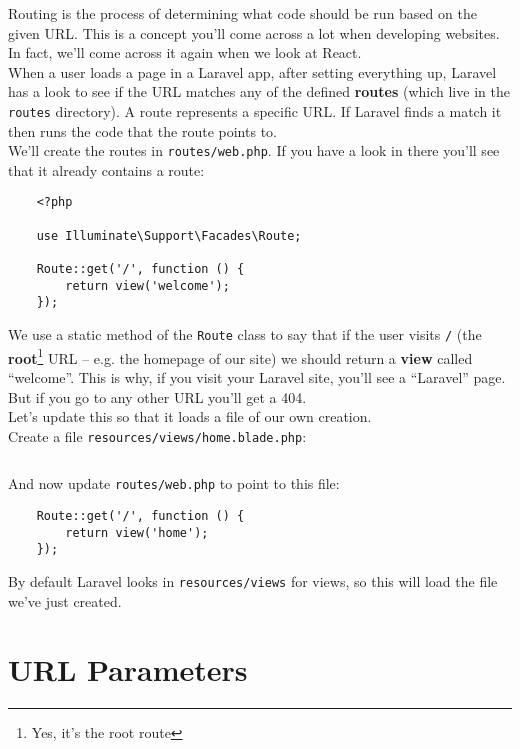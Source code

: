 Routing is the process of determining what code should be run based on the given URL. This is a concept you'll come across a lot when developing websites. In fact, we'll come across it again when we look at React.
\\

When a user loads a page in a Laravel app, after setting everything up, Laravel has a look to see if the URL matches any of the defined \textbf{routes} (which live in the \texttt{routes} directory). A route represents a specific URL. If Laravel finds a match it then runs the code that the route points to.
\\

We'll create the routes in \texttt{routes/web.php}. If you have a look in there you'll see that it already contains a route:

\begin{verbatim}
    <?php

    use Illuminate\Support\Facades\Route;

    Route::get('/', function () {
        return view('welcome');
    });
\end{verbatim}

We use a static method of the \texttt{Route} class to say that if the user visits \texttt{/} (the \textbf{root}\footnote{Yes, it's the root route} URL – e.g. the homepage of our site) we should return a \textbf{view} called ``welcome''. This is why, if you visit your Laravel site, you'll see a ``Laravel'' page. But if you go to any other URL you'll get a 404.
\\

Let's update this so that it loads a file of our own creation.
\\

Create a file \texttt{resources/views/home.blade.php}:

\inputminted{html}{07-routing/figures/01-home.html}

And now update \texttt{routes/web.php} to point to this file:

\begin{verbatim}
    Route::get('/', function () {
        return view('home');
    });
\end{verbatim}

By default Laravel looks in \texttt{resources/views} for views, so this will load the file we've just created.


\section{URL Parameters}

